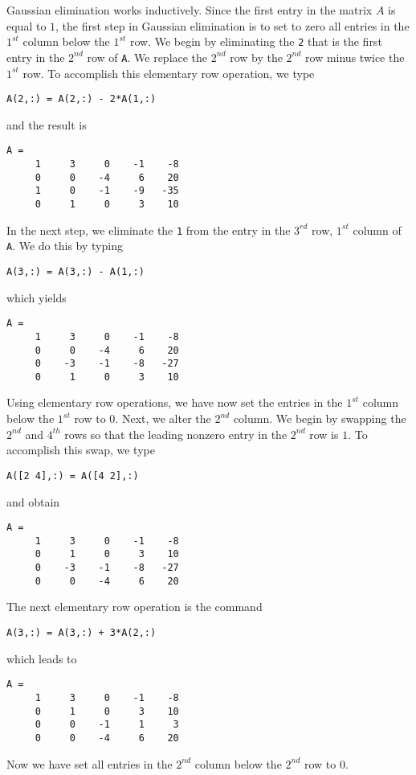 \documentclass{ximera}
\begin{document}
Gaussian elimination  works
inductively.  Since the first entry in the matrix $A$ is equal
to $1$, the first step in Gaussian elimination is to set to zero
all entries in the $1^{st}$ column below the $1^{st}$ row.  We
begin by eliminating the {\tt 2} that is the first entry in the
$2^{nd}$ row of {\tt A}.  We replace the $2^{nd}$ row by the
$2^{nd}$ row minus twice the $1^{st}$ row.  To accomplish this
elementary row operation, we type
\begin{verbatim}
A(2,:) = A(2,:) - 2*A(1,:)
\end{verbatim}
and the result is
\begin{verbatim}
A =
     1     3     0    -1    -8
     0     0    -4     6    20
     1     0    -1    -9   -35
     0     1     0     3    10
\end{verbatim}
In the next step, we eliminate the {\tt 1} from the entry in the
$3^{rd}$ row, $1^{st}$ column of {\tt A}.  We do this by
typing
\begin{verbatim}
A(3,:) = A(3,:) - A(1,:)
\end{verbatim}
which yields
\begin{verbatim}
A =
     1     3     0    -1    -8
     0     0    -4     6    20
     0    -3    -1    -8   -27
     0     1     0     3    10
\end{verbatim}

Using elementary row operations, we have now set the entries
in the $1^{st}$ column below the $1^{st}$ row to $0$.  Next,
we alter the $2^{nd}$ column.  We begin by swapping
the $2^{nd}$ and $4^{th}$ rows so that the leading nonzero entry
in the $2^{nd}$ row is $1$.   To accomplish this swap, we type
\begin{verbatim}
A([2 4],:) = A([4 2],:)
\end{verbatim}
and obtain
\begin{verbatim}
A =
     1     3     0    -1    -8
     0     1     0     3    10
     0    -3    -1    -8   -27
     0     0    -4     6    20
\end{verbatim}
The next elementary row operation is the command
\begin{verbatim}
A(3,:) = A(3,:) + 3*A(2,:)
\end{verbatim}
which leads to
\begin{verbatim}
A =
     1     3     0    -1    -8
     0     1     0     3    10
     0     0    -1     1     3
     0     0    -4     6    20
\end{verbatim}
Now we have set all entries in the $2^{nd}$ column below
the $2^{nd}$ row to $0$.
\end{document}
